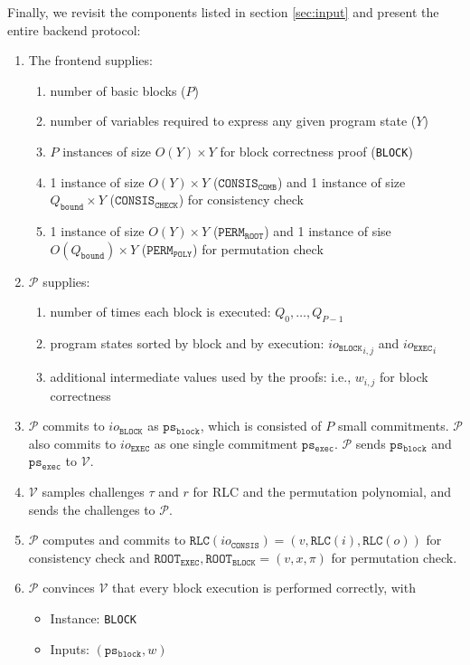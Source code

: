 \documentclass{article}
\newcommand{\code}{\texttt}
\newcommand{\Qbound}{Q_{\mathtt{bound}}}
\renewcommand{\P}{\mathcal{P}}
\newcommand{\V}{\mathcal{V}}
\newcommand{\RLC}{\mathtt{RLC}}
\newcommand{\ioc}{io_{\mathtt{CONSIS}}}
\newcommand{\iob}{io_{\mathtt{BLOCK}}}
\newcommand{\ioe}{io_{\mathtt{EXEC}}}
\newcommand{\ROOTE}{\mathtt{ROOT_{EXEC}}}
\newcommand{\ROOTB}{\mathtt{ROOT_{BLOCK}}}
\newcommand{\psb}{\mathtt{ps_{block}}}
\newcommand{\pse}{\mathtt{ps_{exec}}}
\begin{document}
Finally, we revisit the components listed in section \ref{sec:input} and present the entire backend protocol:
\begin{enumerate}
    \item The frontend supplies:
    \begin{enumerate}
        \item number of basic blocks ($P$)
        \item number of variables required to express any given program state ($Y$)
        \item $P$ instances of size $O(Y)\times Y$ for block correctness proof (\code{BLOCK})
        \item 1 instance of size $O(Y) \times Y$ ($\mathtt{CONSIS}_\mathtt{COMB}$) and 1 instance of size $\Qbound \times Y$ ($\mathtt{CONSIS}_\mathtt{CHECK}$) for consistency check
        \item 1 instance of size $O(Y) \times Y$ ($\mathtt{PERM}_\mathtt{ROOT}$) and 1 instance of sise $O(\Qbound) \times Y$ ($\mathtt{PERM}_\mathtt{POLY}$) for permutation check
    \end{enumerate}
    \item $\P$ supplies:
    \begin{enumerate}
        \item number of times each block is executed: $Q_0, \dots, Q_{P - 1}$
        \item program states sorted by block and by execution: ${\iob}_{i, j}$ and ${\ioe}_i$
        \item additional intermediate values used by the proofs: i.e., $w_{i, j}$ for block correctness
    \end{enumerate}
    \item $\P$ commits to $\iob$ as $\psb$, which is consisted of $P$ small commitments. $\P$ also commits to $\ioe$ as one single commitment $\pse$. $\P$ sends $\psb$ and $\pse$ to $\V$.
    \item $\V$ samples challenges $\tau$ and $r$ for RLC and the permutation polynomial, and sends the challenges to $\P$.
    \item $\P$ computes and commits to $\RLC(\ioc) = (v, \RLC(i), \RLC(o))$ for consistency check and $\ROOTE, \ROOTB = (v, x, \pi)$ for permutation check.
    \item $\P$ convinces $\V$ that every block execution is performed correctly, with
    \begin{itemize}
        \item Instance: \code{BLOCK}
        \item Inputs: $(\psb, w)$

\end{itemize}
\end{enumerate}
\end{document}
